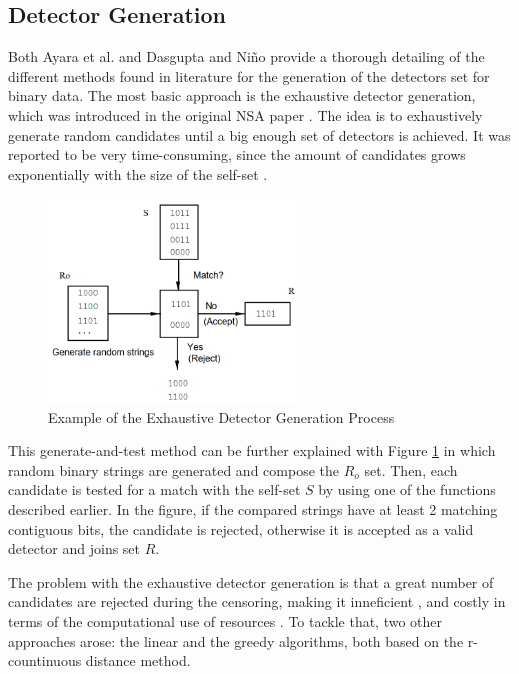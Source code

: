 \subsection{Detector Generation} \label{sec:bgNSADetectors}


Both Ayara et al. \cite{NSADetectorGen2002} and Dasgupta and Niño \cite{ICBook2009} provide a thorough detailing of the different methods found in literature for the generation of the detectors set for binary data. The most basic approach is the exhaustive detector generation, which was introduced in the original NSA paper \cite{Forrest1994}. The idea is to exhaustively generate random candidates until a big enough set of detectors is achieved. It was reported to be very time-consuming, since the amount of candidates grows exponentially with the size of the self-set \cite{LinearNSA1996}.

\begin{figure}[!h]
	\centering
	\includegraphics[width=0.6\textwidth, keepaspectratio]{img/exhaustiveNSA.png}
	\caption{Example of the Exhaustive Detector Generation Process~ \cite{LinearNSA1996} }
	\label{fig:ExhDet}
\end{figure}

This generate-and-test method can be further explained with Figure \ref{fig:ExhDet} in which random binary strings are generated and compose the \(R_o\) set. Then, each candidate is tested for a match with the self-set \(S\) by using one of the functions described earlier. In the figure, if the compared strings have at least 2 matching contiguous bits, the candidate is rejected, otherwise it is accepted as a valid detector and joins set \(R\).

The problem with the exhaustive detector generation is that a great number of candidates are rejected during the censoring, making it inneficient \cite{NSADetGen1996}, and costly in terms of the computational use of resources \cite{NSADetectorGen2002}. To tackle that, two other approaches arose: the linear and the greedy algorithms, both based on the r-countinuous distance method. 

